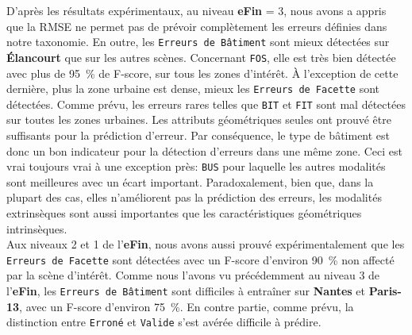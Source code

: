         D'après les résultats expérimentaux, au niveau \textbf{eFin} = 3, nous avons a appris que la RMSE ne permet pas de prévoir complètement les erreurs définies dans notre taxonomie.
        En outre, les \texttt{Erreurs de Bâtiment} sont mieux détectées sur \textbf{\'Elancourt} que sur les autres scènes.
        Concernant \texttt{FOS}, elle est très bien détectée avec plus de \SI{95}{\percent} de F-score, sur tous les zones d'intérêt.
        \`A l'exception de cette dernière, plus la zone urbaine est dense, mieux les \texttt{Erreurs de Facette} sont détectées.
        Comme prévu, les erreurs rares telles que \texttt{BIT} et \texttt{FIT} sont mal détectées sur toutes les zones urbaines.
        Les attributs géométriques seules ont prouvé être suffisants pour la prédiction d'erreur.
        Par conséquence, le type de bâtiment est donc un bon indicateur pour la détection d'erreurs dans une même zone.
        Ceci est vrai toujours vrai à une exception près: \texttt{BUS} pour laquelle les autres modalités sont meilleures avec un écart important.
        Paradoxalement, bien que, dans la plupart des cas, elles n'améliorent pas la prédiction des erreurs, les modalités extrinsèques sont aussi importantes que les caractéristiques géométriques intrinsèques.\\

        Aux niveaux 2 et 1 de l'\textbf{eFin}, nous avons aussi prouvé expérimentalement que les \texttt{Erreurs de Facette} sont détectées avec un F-score d'environ \SI{90}{\percent} non affecté par la scène d'intérêt.
        Comme nous l'avons vu précédemment au niveau 3 de l'\textbf{eFin}, les \texttt{Erreurs de Bâtiment} sont difficiles à entraîner sur \textbf{Nantes} et \textbf{Paris-13}, avec un F-score d'environ \SI{75}{\percent}.
        En contre partie, comme prévu, la distinction entre \texttt{Erroné} et \texttt{Valide} s'est avérée difficile à prédire.

